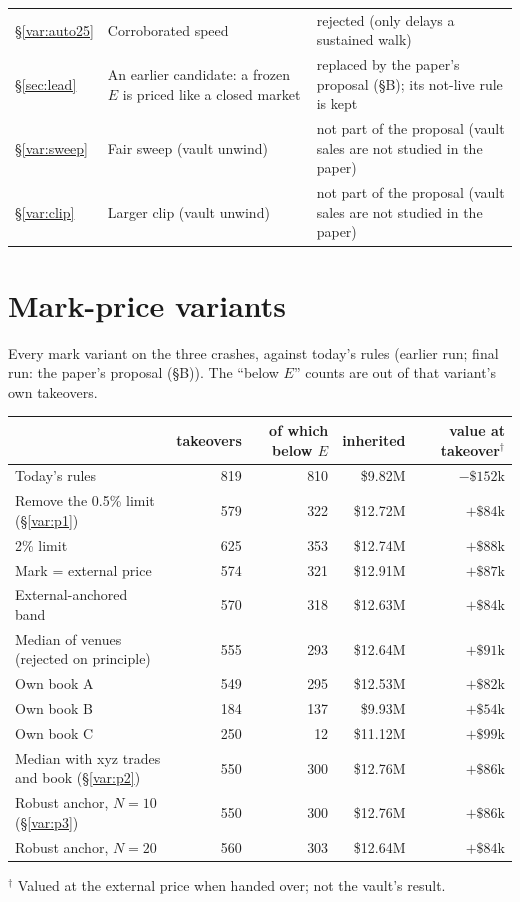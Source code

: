 \documentclass[10.5pt,a4paper]{article}
\begin{document}
{\begin{xltabular}{\textwidth}{@{}l>{\raggedright\arraybackslash}X>{\raggedright\arraybackslash}p{5.2cm}@{}}
\S\ref{var:auto25} & Corroborated speed & rejected (only delays a sustained walk)\\
\S\ref{sec:lead} & An earlier candidate: a frozen \texorpdfstring{$E$}{E} is priced like a closed market & replaced by the paper's proposal (\S B); its not-live rule is kept\\
\S\ref{var:sweep} & Fair sweep (vault unwind) & not part of the proposal (vault sales are not studied in the paper)\\
\S\ref{var:clip} & Larger clip (vault unwind) & not part of the proposal (vault sales are not studied in the paper)\\
\bottomrule
\end{xltabular}}

\section{Mark-price variants}\label{sec:mark}
Every mark variant on the three crashes, against today's rules (earlier run; final run: the paper's proposal (\S B)). The ``below $E$'' counts are out of that variant's own takeovers.\par\vspace{.4ex}
{\footnotesize\begin{tabular}{@{}lrrrr@{}}
\toprule
 & takeovers & of which below $E$ & inherited & value at takeover$^\dagger$\\
\midrule
Today's rules & 819 & 810 & \$9.82M & $-\$152$k\\
Remove the 0.5\% limit (\S\ref{var:p1}) & 579 & 322 & \$12.72M & $+\$84$k\\
2\% limit & 625 & 353 & \$12.74M & $+\$88$k\\
Mark = external price & 574 & 321 & \$12.91M & $+\$87$k\\
External-anchored band & 570 & 318 & \$12.63M & $+\$84$k\\
Median of venues (rejected on principle) & 555 & 293 & \$12.64M & $+\$91$k\\
Own book A & 549 & 295 & \$12.53M & $+\$82$k\\
Own book B & 184 & 137 & \$9.93M & $+\$54$k\\
Own book C & 250 & 12 & \$11.12M & $+\$99$k\\
Median with xyz trades and book (\S\ref{var:p2}) & 550 & 300 & \$12.76M & $+\$86$k\\
Robust anchor, $N=10$ (\S\ref{var:p3}) & 550 & 300 & \$12.76M & $+\$86$k\\
Robust anchor, $N=20$ & 560 & 303 & \$12.64M & $+\$84$k\\
\bottomrule
\end{tabular}\par{\footnotesize $^\dagger$ Valued at the external price when handed over; not the vault's result.}}\par\vspace{.6ex}
\end{document}
